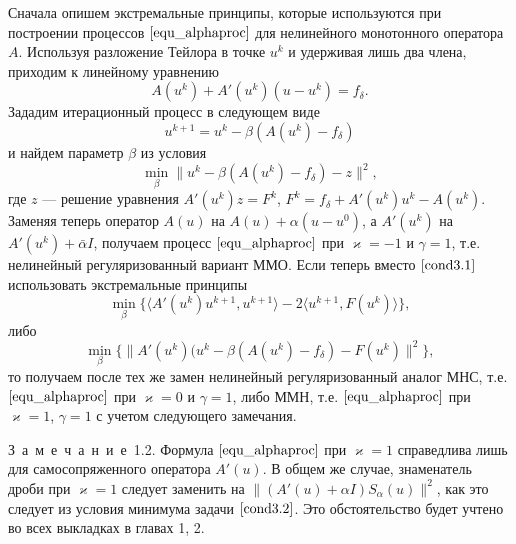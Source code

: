Сначала опишем экстремальные принципы, которые используются при построении процессов $\eqref{equ_alphaproc}$ для нелинейного монотонного оператора $A$. Используя разложение Тейлора в точке $u^k$ и удерживая лишь два члена, приходим к линейному уравнению
\begin{equation*}
A(u^k)+A'(u^k)(u-u^k)=f_{\delta}.
\end{equation*}
Зададим итерационный процесс в следующем виде
\begin{equation*}
u^{k+1}=u^k-\beta(A(u^k)-f_{\delta})
\end{equation*}
и найдем параметр $\beta$ из условия
\begin{equation}\label{cond3.1}
\min_{\beta}{\|u^k-\beta(A(u^k)-f_{\delta})-z\|^2},
\end{equation}
где $z$ --- решение уравнения $A'(u^k)z=F^k$, $F^k=f_{\delta}+A'(u^k)u^k-A(u^k)$. Заменяя теперь оператор $A(u)$ на $A(u)+\alpha(u-u^0)$, а $A'(u^k)$ на $A'(u^k)+\bar\alpha I$, получаем процесс $\eqref{equ_alphaproc}$ при $\varkappa=-1$ и $\gamma=1$, т.е. нелинейный регуляризованный вариант ММО. Если теперь вместо $\eqref{cond3.1}$ использовать экстремальные принципы
$$\min_{\beta}\{\langle A'(u^k)u^{k+1},u^{k+1}\rangle-2\langle u^{k+1},F(u^k)\rangle\},$$
либо 
\begin{equation}\label{cond3.2}
\min_{\beta}\{\|A'(u^k)(u^k-\beta(A(u^k)-f_{\delta})-F(u^k)\|^2\},
\end{equation}
то получаем после тех же замен нелинейный регуляризованный аналог МНС, т.е. $\eqref{equ_alphaproc}$ при $\varkappa=0$ и $\gamma=1$, либо ММН, т.е. $\eqref{equ_alphaproc}$ при $\varkappa=1$, $\gamma=1$ с учетом следующего замечания.

\mbox{З\ а\ м\ е\ ч\ а\ н\ и\ е 1.2.} Формула $\eqref{equ_alphaproc}$ при $\varkappa=1$ справедлива лишь для самосопряженного оператора $A'(u)$. В общем же случае, знаменатель дроби при $\varkappa=1$ следует заменить на $\|(A'(u)+\alpha I)S_\alpha (u)\|^2$, как это следует из условия минимума задачи $\eqref{cond3.2}$. Это обстоятельство будет учтено во всех выкладках в главах 1, 2.

